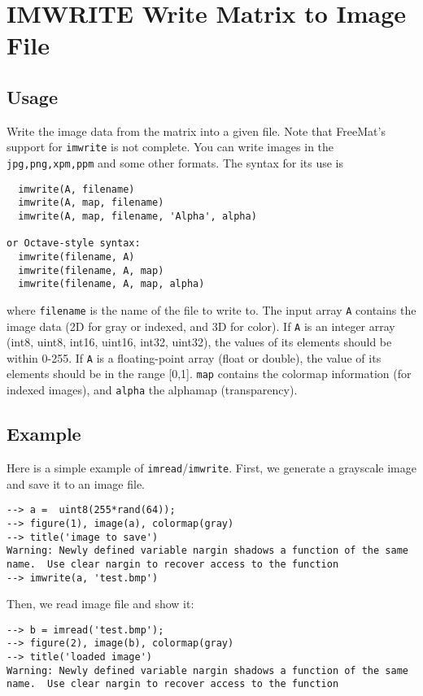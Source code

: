 \section{IMWRITE Write Matrix to Image File}

\subsection{Usage}

Write the image data from the matrix into a given file.  Note that
FreeMat's support for \verb|imwrite| is not complete.
You can write images in the \verb|jpg,png,xpm,ppm| and some other formats.
The syntax for its use is
\begin{verbatim}
  imwrite(A, filename)
  imwrite(A, map, filename)
  imwrite(A, map, filename, 'Alpha', alpha)

or Octave-style syntax:
  imwrite(filename, A)
  imwrite(filename, A, map)
  imwrite(filename, A, map, alpha)
\end{verbatim}
where \verb|filename| is the name of the file to write to.  The input array 
\verb|A| contains the image data (2D for gray or indexed, and 3D for color).  
If \verb|A| is an integer array (int8, uint8, int16, uint16, int32, uint32), 
the values of its elements should be within 0-255.  If \verb|A| is a 
floating-point array (float or double), the value of its elements should
be in the range [0,1].  \verb|map| contains the colormap information
(for indexed images), and \verb|alpha| the alphamap (transparency).
\subsection{Example}

Here is a simple example of \verb|imread|/\verb|imwrite|.  First, we generate
a grayscale image and save it to an image file.
\begin{verbatim}
--> a =  uint8(255*rand(64));
--> figure(1), image(a), colormap(gray)
--> title('image to save')
Warning: Newly defined variable nargin shadows a function of the same name.  Use clear nargin to recover access to the function
--> imwrite(a, 'test.bmp')
\end{verbatim}
Then, we read image file and show it:
\begin{verbatim}
--> b = imread('test.bmp');
--> figure(2), image(b), colormap(gray)
--> title('loaded image')
Warning: Newly defined variable nargin shadows a function of the same name.  Use clear nargin to recover access to the function
\end{verbatim}
